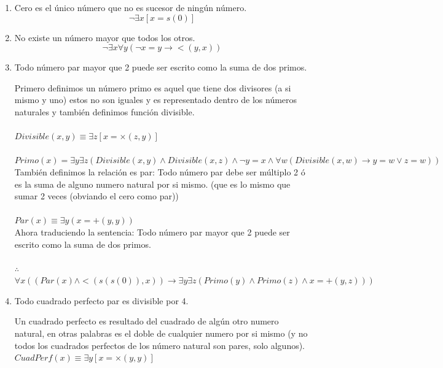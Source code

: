 \documentclass{article}
\begin{document}
\begin{enumerate}
\begin{enumerate}
\begin{enumerate}
		        \item Cero es el único número que no es sucesor de ningún número.
		            $$\neg \exists x [x = s(0)]$$
		        
		        \item No existe un número mayor que todos los otros.
		            $$ \neg \exists x \forall y (\neg x = y  \rightarrow  <(y,x)) $$
		        
		        \item Todo número par mayor que 2 puede ser escrito como la suma de dos primos.\\
    		        \begin{displayquote}
    		            Primero definimos un número primo es aquel que tiene dos divisores (a si mismo y uno) estos no son iguales y es representado dentro de los números naturales y también definimos función divisible.
    		            \\\\
    		            $Divisible(x,y) \equiv  \exists z [x = \times(z,y)]$ \\\\
    		            $Primo(x) = \exists y \exists z ( Divisible(x,y) \wedge Divisible(x,z) \wedge \neg y = x \wedge  \forall w (Divisible(x,w) \rightarrow y = w \vee z = w ) )$\\
    		            
    		            También definimos la relación es par:
    		            Todo número par debe ser múltiplo 2 ó es la suma de alguno numero natural por si mismo. (que es lo mismo que sumar 2 veces (obviando el cero como par))\\\\
    		            
    		            $Par(x) \equiv \exists y (x = +(y,y))$\\
    		            
    		            Ahora traduciendo la sentencia: Todo número par mayor que 2 puede ser escrito como la suma de dos primos.\\
    		            \\ $\therefore$
    		            $\forall x( (Par(x) \wedge <(s(s(0)),x)) \rightarrow \exists y \exists z ( Primo(y) \wedge Primo(z) \wedge x = +(y,z)) )$
    		        \end{displayquote}   
		            
		        \item Todo cuadrado perfecto par es divisible por 4.\\
		            \begin{displayquote}
    		            Un cuadrado perfecto es resultado del cuadrado de algún otro numero natural, en otras palabras es el doble de cualquier numero por si mismo (y no todos los cuadrados perfectos de los número natural son pares, solo algunos).\\
    		            $CuadPerf(x) \equiv \exists y [x = \times(y,y)]$\\
    		            

\end{displayquote}
\end{enumerate}
\end{enumerate}
\end{enumerate}
\end{document}
